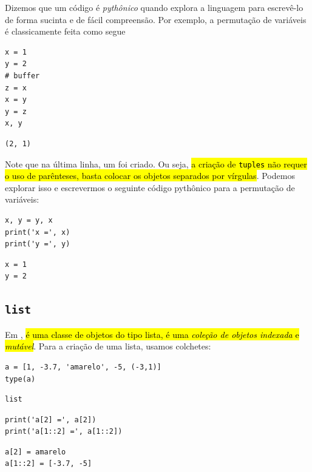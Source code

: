 \begin{obs}
  Dizemos que um código é \emph{pythônico} quando explora a linguagem para escrevê-lo de forma sucinta e de fácil compreensão. Por exemplo, a permutação de variáveis é classicamente feita como segue

\begin{lstlisting}
x = 1
y = 2
# buffer
z = x
x = y
y = z
x, y
\end{lstlisting}

\begin{verbatim}
(2, 1)
\end{verbatim}

Note que na última linha, um {\PYTHONtuple} foi criado. Ou seja, \hl{a criação de \texttt{tuples} não requer o uso de parênteses, basta colocar os objetos separados por vírgulas}. Podemos explorar isso e escrevermos o seguinte código pythônico para a permutação de variáveis:

\begin{lstlisting}
x, y = y, x
print('x =', x)
print('y =', y)
\end{lstlisting}

\begin{verbatim}
x = 1
y = 2
\end{verbatim}

\end{obs}

\subsection{\texttt{list}}

Em {\python}, \hl{{\PYTHONlist} é uma classe de objetos do tipo lista, é uma \emph{coleção de objetos indexada} e \emph{mutável}}. Para a criação de uma lista, usamos colchetes:

\begin{lstlisting}
a = [1, -3.7, 'amarelo', -5, (-3,1)]
type(a)
\end{lstlisting}

\begin{verbatim}
list
\end{verbatim}


\begin{lstlisting}
print('a[2] =', a[2])
print('a[1::2] =', a[1::2])  
\end{lstlisting}

\begin{verbatim}
a[2] = amarelo
a[1::2] = [-3.7, -5]  
\end{verbatim}

